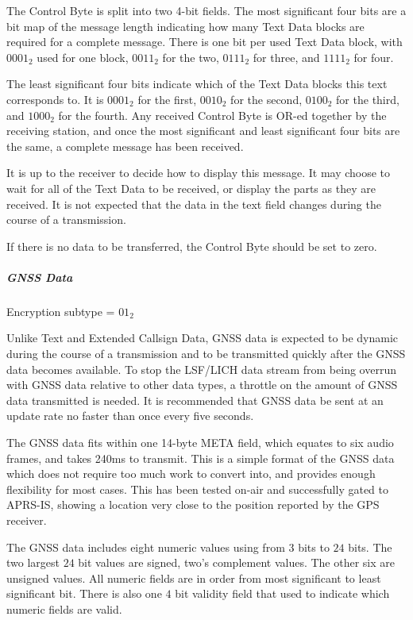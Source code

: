 \documentclass[a4paper,11pt,oneside]{book}
\begin{document}
The Control Byte is split into two 4-bit fields. The most significant four bits are a bit map of the message length indicating how many Text Data blocks are required for a complete message. There is one bit per used Text Data block, with $0001_2$ used for one block, $0011_2$ for the two, $0111_2$ for three, and $1111_2$ for four.

The least significant four bits indicate which of the Text Data blocks this text corresponds to. It is $0001_2$ for the first, $0010_2$ for the second, $0100_2$ for the third, and $1000_2$ for the fourth. Any received Control Byte is OR-ed together by the receiving station, and once the most significant and least significant four bits are the same, a complete message has been received.

It is up to the receiver to decide how to display this message. It may choose to wait for all of the Text Data to be received, or display the parts as they are received. It is not expected that the data in the text field changes during the course of a transmission.

If there is no data to be transferred, the Control Byte should be set to zero.

\subparagraph{GNSS Data}

Encryption subtype = $01_2$

Unlike Text and Extended Callsign Data, GNSS data is expected to be dynamic during the course of a transmission and to be transmitted quickly after the GNSS data becomes available. To stop the LSF/LICH data stream from being overrun with GNSS data relative to other data types, a throttle on the amount of GNSS data transmitted is needed. It is recommended that GNSS data be sent at an update rate no faster than once every five seconds.

The GNSS data fits within one 14-byte META field, which equates to six audio frames, and takes 240ms to transmit. This is a simple format of the GNSS data which does not require too much work to convert into, and provides enough flexibility for most cases. This has been tested on-air and successfully gated to APRS-IS, showing a location very close to the position reported by the GPS receiver.

The GNSS data includes eight numeric values using from $3$ bits to $24$ bits. The two largest $24$ bit values are signed, two's complement values. The other six are unsigned values. All numeric fields are in order from most significant to least significant bit. There is also one $4$ bit validity field that used to indicate which numeric fields are valid.
\end{document}

